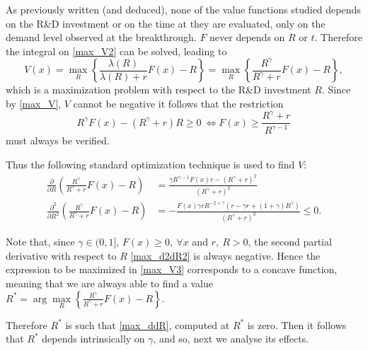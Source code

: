 As previously written (and deduced), none of the value functions studied depends on the R\&D investment or on the time at they are evaluated, only on the demand level observed at the breakthrough. $F$ never depends on $R$ or $t$. Therefore the integral on \eqref{max_V2} can be solved, leading to
\begin{equation}
V(x)=\max_R \left\{ \frac{\lambda(R)}{\lambda(R)+r} F(x) -R \right\}=\max_R \left\{ \frac{R^\gamma}{R^\gamma+r} F(x) -R \right\},
\label{max_V3}
\end{equation}
which is a maximization problem with respect to the R\&D investment $R$. Since by \eqref{max_V}, $V$ cannot be negative it follows that the restriction
\begin{equation}
R^\gamma F(x) - (R^\gamma+r)R \geq 0 \ \Leftrightarrow  F(x) \geq \frac{R^\gamma+r}{R^{\gamma-1}}
	\label{max_rest}
\end{equation}
must always be verified.

Thus the following standard optimization technique is used to find $V$:
\begin{align}
\frac{\partial}{\partial R} \left( \frac{R^\gamma}{R^\gamma+r} F(x) -R \right) &= \frac{\gamma R^{\gamma-1}F(x)r-(R^\gamma+r)^2}{(R^\gamma+r)^2} \label{max_ddR}\\
\frac{\partial^2}{\partial R^2} \left( \frac{R^\gamma}{R^\gamma+r} F(x) -R \right) &=
-\frac{F(x) \gamma r R^{-2+\gamma}(r-\gamma r+(1+\gamma)R^\gamma)}{(R^\gamma+r)^3}\leq 0.
\label{max_d2dR2}
\end{align}

Note that, since $\gamma \in (0,1]$, $F(x)\geq0, \ \forall x$ and $r, \ R >0$, the second partial derivative with respect to $R$ \eqref{max_d2dR2} is always negative. Hence the expression to be maximized in \eqref{max_V3} corresponds to a concave function, meaning that we are always able to find a value $R^*=\arg \underset{R}{\max} \left\{ \frac{R^\gamma}{R^\gamma+r} F(x) -R \right\}$.

Therefore $R^*$ is such that \ref{max_ddR}, computed at $R^*$ is zero. Then it follows that $R^*$ depends intrinsically on $\gamma$, and so, next we analyse its effects.



